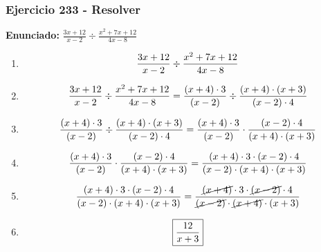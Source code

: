 \documentclass[11pt,a4paper]{article}
\newcommand{\fitmath}[1]{%
\[
\setbox0=\hbox{$\displaystyle #1$}%
\ifdim\wd0>\linewidth
\resizebox{\linewidth}{!}{$\displaystyle #1$}%
\else
#1%
\fi
\]
}
\begin{document}
\subsubsection*{Ejercicio 233 - Resolver}
\textbf{Enunciado:} $ \frac{3 x + 12}{x - 2} \div \frac{x^{2} + 7 x + 12}{4 x - 8} $\par
\begin{enumerate}[leftmargin=2em]
\item \fitmath{\frac{3 x + 12}{x - 2} \div \frac{x^{2} + 7 x + 12}{4 x - 8}}
\item \fitmath{\frac{3 x + 12}{x - 2} \div \frac{x^{2} + 7 x + 12}{4 x - 8}= \frac{\left(x + 4\right)\cdot 3}{\left(x - 2\right)} \div \frac{\left(x + 4\right)\cdot \left(x + 3\right)}{\left(x - 2\right)\cdot 4}}
\item \fitmath{\frac{\left(x + 4\right)\cdot 3}{\left(x - 2\right)}\div \frac{\left(x + 4\right)\cdot \left(x + 3\right)}{\left(x - 2\right)\cdot 4}= \frac{\left(x + 4\right)\cdot 3}{\left(x - 2\right)}\cdot \frac{\left(x - 2\right)\cdot 4}{\left(x + 4\right)\cdot \left(x + 3\right)}}
\item \fitmath{\frac{\left(x + 4\right)\cdot 3}{\left(x - 2\right)}\cdot \frac{\left(x - 2\right)\cdot 4}{\left(x + 4\right)\cdot \left(x + 3\right)}= \frac{\left(x + 4\right)\cdot 3\cdot \left(x - 2\right)\cdot 4}{\left(x - 2\right)\cdot \left(x + 4\right)\cdot \left(x + 3\right)}}
\item \fitmath{\frac{\left(x + 4\right)\cdot 3\cdot \left(x - 2\right)\cdot 4}{\left(x - 2\right)\cdot \left(x + 4\right)\cdot \left(x + 3\right)}= \frac{\cancel{\left(x + 4\right)}\cdot 3\cdot \cancel{\left(x - 2\right)}\cdot 4}{\cancel{\left(x - 2\right)}\cdot \cancel{\left(x + 4\right)}\cdot \left(x + 3\right)}}
\item \fitmath{\boxed{\frac{12}{x + 3}}}
\end{enumerate}

\vspace{0.12cm}
\end{document}
